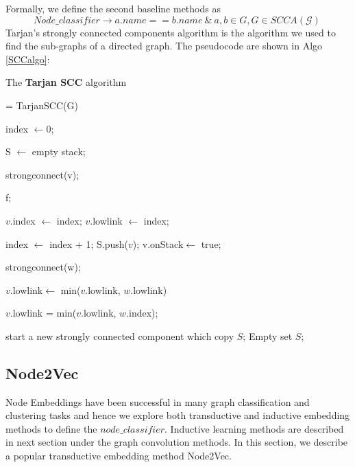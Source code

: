 \documentclass[sigconf, nonacm]{acmart}
\begin{document}
Formally, we define the second baseline methods as
$$Node\_classifier \to  a.name == b.name\ \&\ a, b \in G, G \in SCCA(\mathcal{G})\  $$
Tarjan's strongly connected components algorithm is the algorithm we used to find the sub-graphs of a directed graph. The pseudocode are shown in Algo \ref{SCCalgo}:
\begin{algorithm}[htbp]  
	\caption{The \textbf{Tarjan SCC} algorithm\cite{SCCwiki}}  
	\label{SCCalgo}  
	\begin{algorithmic}[1]  
		= TarjanSCC(G) 
		
		index $\gets 0$;
		
		S $\gets $ empty stack;
		
		
		
		\qquad strongconnect(v);
		    
		 \EndIf
		 
		 \EndFor
		   
		\Return f;  
		
		\EndFunction
		
		
		$v$.index $\gets$ index; $v$.lowlink $\gets$ index;
		
		index $\gets$ index + 1; S.push($v$); v.onStack$\gets $ true;
		
		 
		 
		\qquad strongconnect(w);
		
		$v$.lowlink$\gets$ min($v$.lowlink, $w$.lowlink)
		
		
		\qquad $v$.lowlink = min($v.$lowlink, $w.$index);
		
		\EndIf
		
		\EndFor
		
		  
		  \qquad start a new strongly connected component which copy $S$; Empty set $S$;
		  \EndIf
		\EndFunction
	\end{algorithmic}
\end{algorithm} 
\subsection{Node2Vec}
Node Embeddings have been successful in many graph classification and clustering tasks and hence we explore both transductive and inductive embedding methods to define the $node\_classifier$. Inductive learning methods are described in next section under the graph convolution methods. In this section, we describe a popular transductive embedding method Node2Vec.
\end{document}
